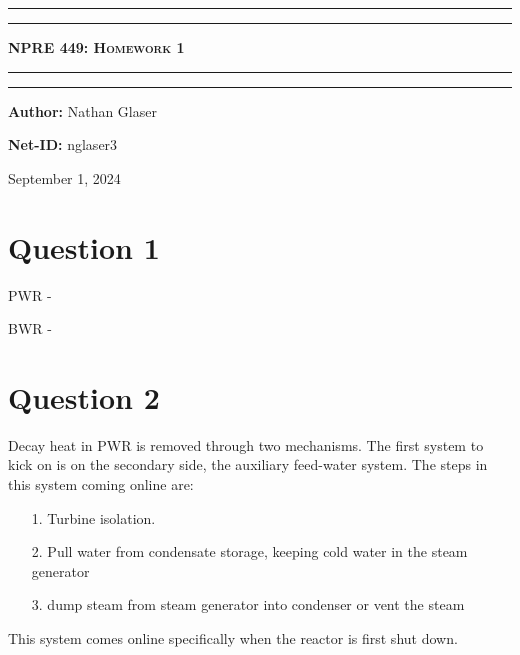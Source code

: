 \documentclass{article}
\begin{document}
\begin{titlepage}

\centering
\scshape
\vspace{\baselineskip}

%
\rule{\textwidth}{1.6pt}\vspace*{-\baselineskip}\vspace*{2pt}
\rule{\textwidth}{0.4pt}

{\Huge \textbf{\textsc{NPRE 449: Homework 1 \\
\vspace{15pt}}}}

\rule{\textwidth}{0.4pt}\vspace*{-\baselineskip}\vspace{3.2pt}
\rule{\textwidth}{1.6pt}\vspace{6pt}
\vspace{1.5\baselineskip}


\large \centerline{\textbf{Author:} Nathan Glaser}
\large \centerline{\textbf{Net-ID:} nglaser3}
\quad

\vfill
\large \centerline{September 1, 2024}
%
\end{titlepage}

\tableofcontents
\newpage
{}


\section{Question 1}
PWR - 

BWR - 



\section{Question 2}

Decay heat in PWR is removed through two mechanisms. The first system to kick on is on the secondary side, the auxiliary feed-water system. The steps in this system coming online are:
\begin{itemize}
    \item[1.] Turbine isolation. 
    \item [2.] Pull water from condensate storage, keeping cold water in the steam generator
    \item[3.] dump steam from steam generator into condenser or vent the steam
\end{itemize}
This system comes online specifically when the reactor is first shut down. 
\end{document}
